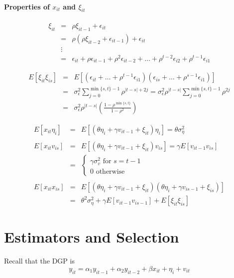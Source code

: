 \documentclass[12pt]{article}
\begin{document}
\paragraph{Properties of $x_{it}$ and $\xi_{it}$}
\begin{eqnarray*}
  \xi_{it} &=& \rho \xi_{it-1} + \epsilon_{it}\\
    &=& \rho(\rho \xi_{it-2} + \epsilon_{it-1}) + \epsilon_{it}\\
    &\vdots&\\
    &=& \epsilon_{it} + \rho \epsilon_{it-1} +\rho^2 \epsilon_{it-2} + \hdots + \rho^{t-2}\epsilon_{i2} + \rho^{t-1}\epsilon_{i1}
\end{eqnarray*}


\begin{eqnarray*}
  E[\xi_{it}\xi_{is}] &=& E\left[ \left(\epsilon_{it} + \hdots +  \rho^{t-1}\epsilon_{i1}\right) \left(\epsilon_{is} + \hdots +  \rho^{s-1}\epsilon_{i1}\right) \right]\\
    &=& \sigma_\epsilon^2 \sum_{j=0}^{\min\{s,t \}-1} \rho^{|t-s| + 2j} = \sigma_\epsilon^2 \rho^{|t-s|} \sum_{j=0}^{\min\{s,t \}-1} \rho^{ 2j}\\
  &=&  \sigma_\epsilon^2 \rho^{|t-s|}\left(\frac{1 - \rho^{\min\{s,t\}}}{1-\rho^2} \right)
\end{eqnarray*}

\begin{eqnarray*}
E[x_{it}\eta_i] &=& E[(\theta \eta_i + \gamma v_{it-1} + \xi_{it})\eta_i] =  \theta \sigma_\eta^2\\ \\
  E[x_{it}v_{is}] &=& E[(\theta \eta_i + \gamma v_{it-1} + \xi_{it})v_{is}] = \gamma E[v_{it-1}v_{is}]\\
    &=& \left\{\begin{array}{l}\gamma \sigma_v^2 \mbox{ for } s=t-1 \\0 \mbox{ otherwise} \end{array} \right.\\ \\
  E[x_{it}x_{is}] &=& E[(\theta \eta_i + \gamma v_{it-1} + \xi_{it})(\theta \eta_i + \gamma v_{is-1} + \xi_{is})]\\
    &=& \theta^2 \sigma_\eta^2 +\gamma E[v_{it-1}v_{is-1}] + E[\xi_{it}\xi_{is}]
\end{eqnarray*}



\section{Estimators and Selection}
Recall that the DGP is
  $$y_{it} = \alpha_1 y_{it-1} + \alpha_2 y_{it-2} + \beta x_{it} + \eta_i +  v_{it}$$
\end{document}
